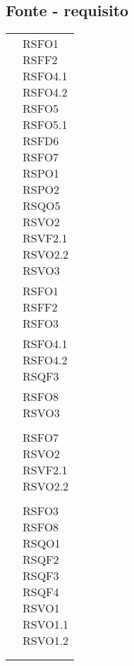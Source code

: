 {{{{{\subsection{Fonte - requisito}\label{RequisitiTracciamentoDeiRequisitiFonteRequisito}
\def\tabularxcolumn#1{m{#1}}
{
	\begin{center}
		\renewcommand{\arraystretch}{1.4}
		\begin{longtable}{|p{7.5cm}|p{7.5cm}|}
		\hline
		\rowcolor{airforceblue}
		\makecell[c]{\textbf{Fonte}} & \makecell[c]{\textbf{Codice RS}}  \\
		\hline
		\makecell[c]{Capitolato$_{\scaleto{G}{3pt}}$} & \makecell[c]{RSFO1\\RSFF2\\RSFO4.1\\RSFO4.2\\RSFO5\\RSFO5.1\\RSFD6\\RSFO7\\RSPO1\\RSPO2\\RSQO5\\RSVO2\\RSVF2.1\\RSVO2.2\\RSVO3} \\
		\hline
		\makecell[c]{FC1.1} & \makecell[c]{RSFO1 \\ RSFF2 \\ RSFO3} \\
		\hline
		\makecell[c]{FC1.2} & \makecell[c]{RSFO4.1 \\ RSFO4.2 \\ RSQF3} \\
		\hline
		\makecell[c]{FC1.3} & \makecell[c]{RSFO8 \\ RSVO3} \\ 
		\hline
		\makecell[c]{FC2} & \makecell[c]{RSFD6} \\ 
		\hline
		\makecell[c]{FC3.1} & \makecell[c]{RSFO7 \\ RSVO2\\RSVF2.1\\RSVO2.2} \\
		\hline
		\makecell[c]{FC3.2} & \makecell[c]{RSVO4} \\
		\hline
		\makecell[c]{Interno} &\makecell[c]{RSFO3\\RSFO8\\RSQO1\\RSQF2\\RSQF3\\RSQF4\\RSVO1\\RSVO1.1\\RSVO1.2} \\
		\hline
		\makecell[c]{Verbale esterno 17-12-2020} & \makecell[c]{RSFO1} \\
		\hline
		\rowcolor{white}
		

\end{longtable}
\end{center}}}}}}}
